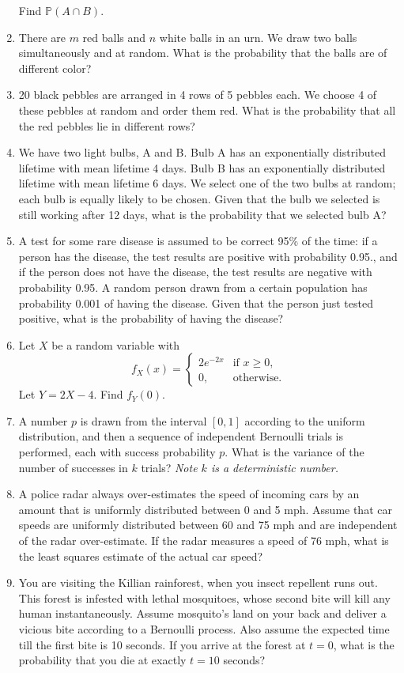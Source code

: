 \documentclass[a4paper,9pt,landscape]{extarticle}
\begin{document}
\begin{multicols*}{3}
\begin{enumerate}
	Find $\mathds{P}(A\cap B)$.
	\item There are $m$ red balls and $n$ white balls in an urn. We draw two balls simultaneously and at random. What is the probability that the balls are of different color?
	\item 20 black pebbles are arranged in 4 rows of 5 pebbles each. We choose 4 of these pebbles at random and order them red. What is the probability that all the red pebbles lie in different rows?
	\item We have two light bulbs, A and B. Bulb A has an exponentially distributed lifetime with mean lifetime 4 days. Bulb B has an exponentially distributed lifetime with mean lifetime 6 days. We select one of the two bulbs at random; each bulb is equally likely to be chosen. Given that the bulb we selected is still working after 12 days, what is the probability that we selected bulb A?
	\item A test for some rare disease is assumed to be correct 95\% of the time: if a person has the disease, the test results are positive with probability 0.95., and if the person does not have the disease, the test results are negative with probability 0.95. A random person drawn from a certain population has probability 0.001 of having the disease. Given that the person just tested positive, what is the probability of having the disease?
	\item Let $X$ be a random variable with
	$$f_X(x)=\begin{cases}
		2e^{-2x}&\text{if }x\geq0,\\
		0,&\text{otherwise.}
	\end{cases}$$
	Let $Y=2X-4$. Find $f_Y(0)$.
	\item A number $p$ is drawn from the interval $[0,1]$ according to the uniform distribution, and then a sequence of independent Bernoulli trials is performed, each with success probability $p$. What is the variance of the number of successes in $k$ trials? {\it Note $k$ is a deterministic number.}
	\item A police radar always over-estimates the speed of incoming cars by an amount that is uniformly distributed between 0 and 5 mph. Assume that car speeds are uniformly distributed between 60 and 75 mph and are independent of the radar over-estimate. If the radar measures a speed of 76 mph, what is the least squares estimate of the actual car speed?
	\item You are visiting the Killian rainforest, when you insect repellent runs out. This forest is infested with lethal mosquitoes, whose second bite will kill any human instantaneously. Assume mosquito's land on your back and deliver a vicious bite according to a Bernoulli process. Also assume the expected time till the first bite is 10 seconds. If you arrive at the forest at $t=0$, what is the probability that you die at exactly $t=10$ seconds?

\end{enumerate}
\end{multicols*}
\end{document}
